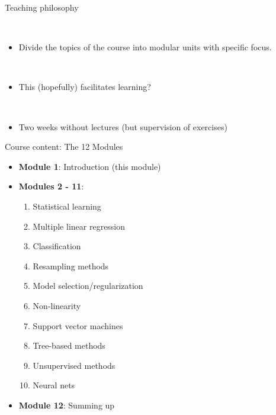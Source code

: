 \documentclass[10pt,ignorenonframetext,]{beamer}
\providecommand{\tightlist}{%
  \setlength{\itemsep}{0pt}\setlength{\parskip}{0pt}}
\begin{document}
\begin{frame}

\begin{block}{Teaching philosophy}

~

\begin{itemize}
\tightlist
\item
  Divide the topics of the course into modular units with specific
  focus.
\end{itemize}

~

\begin{itemize}
\tightlist
\item
  This (hopefully) facilitates learning?
\end{itemize}

~

\begin{itemize}
\tightlist
\item
  Two weeks without lectures (but supervision of exercises)
\end{itemize}

\end{block}

\end{frame}

\begin{frame}

\begin{block}{Course content: The 12 Modules}

\vspace{2mm}

\begin{itemize}
\tightlist
\item
  \textbf{Module 1}: Introduction (this module)
\item
  \textbf{Modules 2 - 11}:

  \begin{enumerate}
  \def\labelenumi{\arabic{enumi})}
  \setcounter{enumi}{1}
  \tightlist
  \item
    Statistical learning
  \item
    Multiple linear regression
  \item
    Classification
  \item
    Resampling methods
  \item
    Model selection/regularization
  \item
    Non-linearity
  \item
    Support vector machines
  \item
    Tree-based methods
  \item
    Unsupervised methods
  \item
    Neural nets
  \end{enumerate}
\item
  \textbf{Module 12}: Summing up
\end{itemize}

\end{block}

\end{frame}
\end{document}
